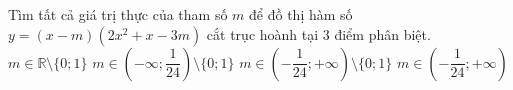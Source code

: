 \begin{ex}%
Tìm tất cả giá trị thực của tham số $m$ để đồ thị hàm số $y=(x-m)\left(2x^2+x-3m\right)$ cắt trục hoành tại $3$ điểm phân biệt.
\choice
{$m\in\mathbb{R}\setminus\{0;1\}$}
{$m\in\left(-\infty;\dfrac{1}{24}\right)\setminus\{0;1\}$}
{\True $m\in\left(-\dfrac{1}{24};+\infty\right)\setminus\{0;1\}$}
{$m\in\left(-\dfrac{1}{24};+\infty\right)$}
\end{ex}
